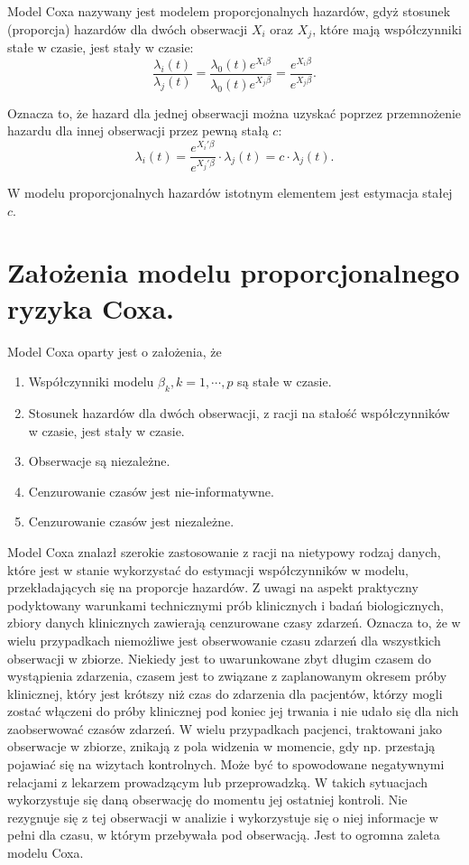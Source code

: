Model Coxa nazywany jest modelem proporcjonalnych hazardów, gdyż stosunek (proporcja) hazardów dla dwóch obserwacji $X_i$ oraz $X_j$, które mają współczynniki stałe w czasie, jest stały w czasie:  
$$\dfrac{\lambda_i(t)}{\lambda_j(t)} = \dfrac{\lambda_0(t)e^{X_i\beta}}{\lambda_0(t)e^{X_j\beta}} = \dfrac{e^{X_i\beta}}{e^{X_j\beta}}.$$

Oznacza to, że hazard dla jednej obserwacji można uzyskać poprzez przemnożenie hazardu dla innej obserwacji przez pewną stałą $c$:
$$\lambda_i(t) = \dfrac{e^{X_i'\beta}}{e^{X_j'\beta}} \cdot \lambda_j(t) = c \cdot \lambda_j(t).$$

W modelu proporcjonalnych hazardów istotnym elementem jest estymacja stałej $c$.

\section{Założenia modelu proporcjonalnego ryzyka Coxa.}

Model Coxa oparty jest o założenia, że
\begin{enumerate}
\item Współczynniki modelu $\beta_k, k = 1,\cdots,p$ są stałe w czasie.
\item Stosunek hazardów dla dwóch obserwacji, z racji na stałość współczynników w czasie, jest stały w czasie.
\item Obserwacje są niezależne.
\item Cenzurowanie czasów jest nie-informatywne.
\item Cenzurowanie czasów jest niezależne.
\end{enumerate}

Model Coxa znalazł szerokie zastosowanie z racji na nietypowy rodzaj danych, które jest w stanie wykorzystać do estymacji współczynników w modelu, przekładających się na proporcje hazardów. Z uwagi na aspekt praktyczny podyktowany warunkami technicznymi prób klinicznych i badań biologicznych, zbiory danych klinicznych zawierają cenzurowane czasy zdarzeń. Oznacza to, że w wielu przypadkach niemożliwe jest obserwowanie czasu zdarzeń dla wszystkich obserwacji w zbiorze. Niekiedy jest to uwarunkowane zbyt długim czasem do wystąpienia zdarzenia, czasem jest to związane z zaplanowanym okresem próby klinicznej, który jest krótszy niż czas do zdarzenia dla pacjentów, którzy mogli zostać włączeni do próby klinicznej pod koniec jej trwania i nie udało się dla nich zaobserwować czasów zdarzeń. W wielu przypadkach pacjenci, traktowani jako obserwacje w zbiorze, znikają z pola widzenia w momencie, gdy np. przestają pojawiać się na wizytach kontrolnych. Może być to spowodowane negatywnymi relacjami z lekarzem prowadzącym lub przeprowadzką. W takich sytuacjach wykorzystuje się daną obserwację do momentu jej ostatniej kontroli. Nie rezygnuje się z tej obserwacji w analizie i wykorzystuje się o niej informacje w pełni dla czasu, w którym przebywała pod obserwacją. Jest to ogromna zaleta modelu Coxa.

